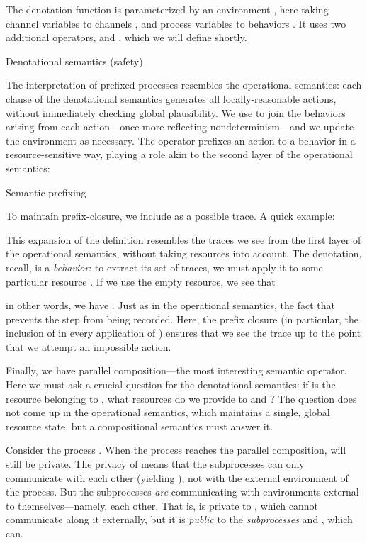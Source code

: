 \documentclass{entcs}
\begin{document}
The denotation function is parameterized by an environment ,
here taking channel variables  to channels , and process
variables  to behaviors .  It uses two additional operators,
 and , which we will define shortly.
\begin{display}
[]
{Denotational semantics (safety)}

\end{display}

The interpretation of prefixed processes resembles the operational
semantics: each clause of the denotational semantics generates all
locally-reasonable actions, without immediately checking global
plausibility.  We use  to join the behaviors arising from each
action---once more reflecting nondeterminism---and we update the
environment as necessary.  The operator  prefixes an
action  to a behavior  in a resource-sensitive way, playing
a role akin to the second layer of the operational semantics:
\begin{display}
[]
{Semantic prefixing}

\end{display}
To maintain prefix-closure, we include  as a possible trace.
A quick example: 

This expansion of the definition resembles the traces we see from the
first layer of the operational semantics, without taking resources
into account.  The denotation, recall, is a \emph{behavior}: to
extract its set of traces, we must apply it to some particular
resource .  If we use the empty resource, we see that

in other words, we have .  Just as in the
operational semantics, the fact that  prevents the  step from being recorded.  Here, the prefix
closure (in particular, the inclusion of  in every
application of ) ensures that we see the trace up to the point
that we attempt an impossible action.

Finally, we have parallel composition---the most interesting semantic
operator.  Here we must ask a crucial question for the denotational
semantics: if  is the resource belonging to , what
resources do we provide to  and ?  The question does not come up
in the operational semantics, which maintains a single, global
resource state, but a compositional semantics must answer it.

Consider the process .  When the process
reaches the parallel composition,  will still be private.  The
privacy of  means that the subprocesses can only communicate with
each other (yielding ), not with the external environment of the
process.  But the subprocesses \emph{are} communicating with
environments external to themselves---namely, each other.  That is,
 is private to , which cannot communicate along
it externally, but it is \emph{public} to the \emph{subprocesses}
 and , which can.
\end{document}
